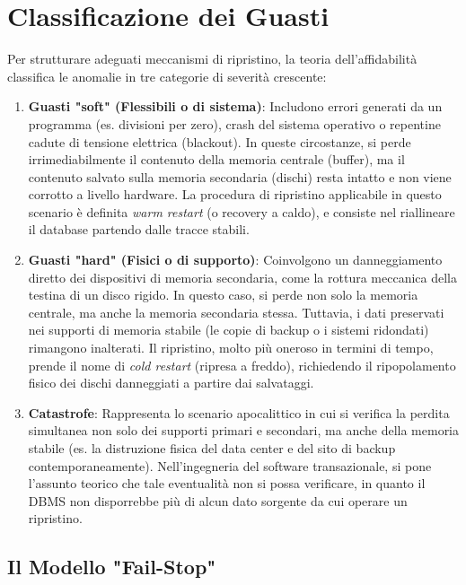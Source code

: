 \section{Classificazione dei Guasti}

Per strutturare adeguati meccanismi di ripristino, la teoria dell'affidabilità classifica le anomalie in tre categorie di severità crescente:

\begin{enumerate}
    \item \textbf{Guasti "soft" (Flessibili o di sistema)}: Includono errori generati da un programma (es. divisioni per zero), crash del sistema operativo o repentine cadute di tensione elettrica (blackout). In queste circostanze, si perde irrimediabilmente il contenuto della memoria centrale (buffer), ma il contenuto salvato sulla memoria secondaria (dischi) resta intatto e non viene corrotto a livello hardware. La procedura di ripristino applicabile in questo scenario è definita \textit{warm restart} (o recovery a caldo), e consiste nel riallineare il database partendo dalle tracce stabili.
    \item \textbf{Guasti "hard" (Fisici o di supporto)}: Coinvolgono un danneggiamento diretto dei dispositivi di memoria secondaria, come la rottura meccanica della testina di un disco rigido. In questo caso, si perde non solo la memoria centrale, ma anche la memoria secondaria stessa. Tuttavia, i dati preservati nei supporti di memoria stabile (le copie di backup o i sistemi ridondati) rimangono inalterati. Il ripristino, molto più oneroso in termini di tempo, prende il nome di \textit{cold restart} (ripresa a freddo), richiedendo il ripopolamento fisico dei dischi danneggiati a partire dai salvataggi.
    \item \textbf{Catastrofe}: Rappresenta lo scenario apocalittico in cui si verifica la perdita simultanea non solo dei supporti primari e secondari, ma anche della memoria stabile (es. la distruzione fisica del data center e del sito di backup contemporaneamente). Nell'ingegneria del software transazionale, si pone l'assunto teorico che tale eventualità non si possa verificare, in quanto il DBMS non disporrebbe più di alcun dato sorgente da cui operare un ripristino.
\end{enumerate}

\subsection{Il Modello "Fail-Stop"}

